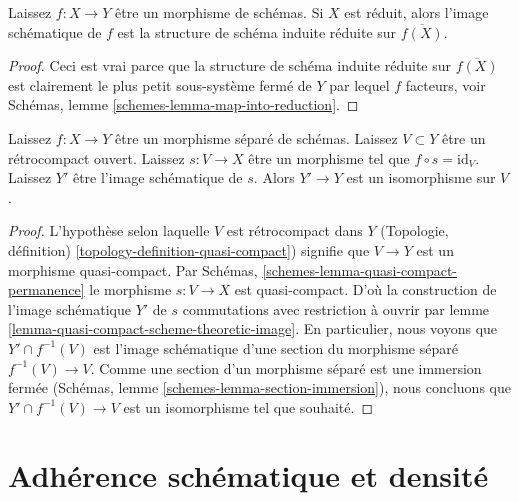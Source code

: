 \begin{lemma}

\label{lemma-scheme-theoretic-image-reduced}
Laissez $f : X \to Y$ être un morphisme de schémas. Si $X$ est réduit, alors l'image schématique de $f$ est la structure de schéma induite réduite sur $\overline{f(X)}$.
\end{lemma}

\begin{proof}
Ceci est vrai parce que la structure de schéma induite réduite sur $\overline{f(X)}$ est clairement le plus petit sous-système fermé de $Y$ par lequel $f$ facteurs, voir Schémas, lemme \ref{schemes-lemma-map-into-reduction}.
\end{proof}

\begin{lemma}

\label{lemma-scheme-theoretic-image-of-partial-section}
Laissez $f : X \to Y$ être un morphisme séparé de schémas. Laissez $V \subset Y$ être un rétrocompact ouvert. Laissez $s : V \to X$ être un morphisme tel que $f \circ s = \text{id}_V$. Laissez $Y'$ être l'image schématique de $s$. Alors $Y' \to Y$ est un isomorphisme sur $V$.
\end{lemma}

\begin{proof}

L'hypothèse selon laquelle $V$ est rétrocompact dans $Y$
(Topologie, définition) \ref{topology-definition-quasi-compact}) signifie que $V \to Y$ est un morphisme quasi-compact. Par Schémas, \ref{schemes-lemma-quasi-compact-permanence}
le morphisme $s : V \to X$ est quasi-compact. D'où la construction de l'image schématique $Y'$
de $s$ commutations avec restriction à ouvrir par lemme \ref{lemma-quasi-compact-scheme-theoretic-image}. En particulier, nous voyons que $Y' \cap f^{-1}(V)$ est l'image schématique d'une section du morphisme séparé $f^{-1}(V) \to V$. Comme une section d'un morphisme séparé est une immersion fermée (Schémas, lemme \ref{schemes-lemma-section-immersion}), nous concluons que
$Y' \cap f^{-1}(V) \to V$ est un isomorphisme tel que souhaité.

\end{proof}







\section{Adhérence schématique et densité}
\label{section-scheme-theoretic-closure}

